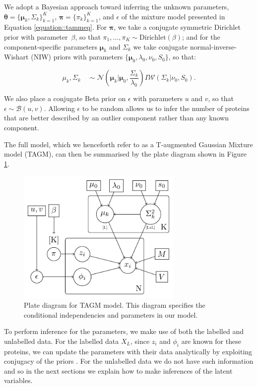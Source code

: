 \documentclass[12pt,english]{article}\usepackage[]{graphicx}\usepackage[]{color}
\begin{document}
We adopt a Bayesian approach toward inferring the unknown parameters,
$\boldsymbol{\theta} = \{\boldsymbol{\mu}_k, \Sigma_k \}_{k = 1}^K$,
$\boldsymbol{\pi} = \{\pi_k\}_{k = 1}^K$, and $\epsilon$ of the
mixture model presented in Equation \eqref{equation::tammeq}.  For
$\boldsymbol{\pi}$, we take a conjugate symmetric Dirichlet prior with
parameter~$\beta$, so that
$\pi_1, \ldots, \pi_K \sim \mbox{Dirichlet}(\beta)$; and for the
component-specific parameters $\boldsymbol{\mu}_k$ and $\Sigma_k$ we
take conjugate normal-inverse-Wishart (NIW) priors with parameters
$\{\boldsymbol{\mu}_0, \lambda_0, \nu_0, S_0\}$, so that:

\begin{equation} \label{equation::prior}
  \mu_k, \Sigma_k \quad \sim \mathcal{N}\left(\boldsymbol{\mu}_k|\boldsymbol{\mu}_0, \frac{\Sigma_{k}}{\lambda_0}\right)I\mathcal{W}\left(\Sigma_{k}|\nu_0, S_0\right).
\end{equation}

We also place a conjugate Beta prior on $\epsilon$ with parameters $u$
and $v$, so that $\epsilon \sim \mathcal{B}(u,v)$.  Allowing
$\epsilon$ to be random allows us to infer the number of proteins that
are better described by an outlier component rather than any known
component.

The full model, which we henceforth refer to as a T-augmented Gaussian
Mixture model (TAGM), can then be summarised by the plate diagram
shown in Figure \ref{plateDiagram}.

\begin{figure}[H]
  \includegraphics[width=8cm]{graphmodel2.pdf}
  \centering
  \caption{Plate diagram for TAGM model. This diagram specifies the
    conditional independencies and parameters in our
    model.}\label{plateDiagram}
\end{figure}

To perform inference for the parameters, we make use of both the
labelled and unlabelled data. For the labelled data $X_L$, since $z_i$
and $\phi_i$ are known for these proteins, we can update the
parameters with their data analytically by exploiting conjugacy of the
priors \citep[see, for example,][]{Gelman:1995}. For the unlabelled
data we do not have such information and so in the next sections we
explain how to make inferences of the latent variables.
\end{document}
